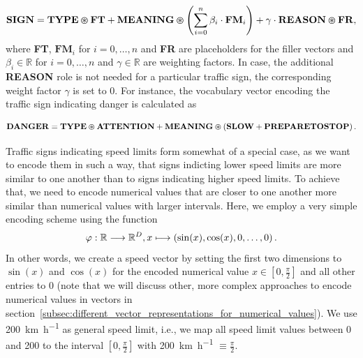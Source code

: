 \begin{equation}
    \label{eq:semantic_vocab_traffic_signs}
    \mathbf{SIGN} = \mathbf{TYPE} \varoast \mathbf{FT} + \mathbf{MEANING} \varoast \left( \sum\limits_{i=0}^{n} \beta_{i} \cdot  \mathbf{FM}_{i}  \right) + \gamma \cdot \mathbf{REASON} \varoast \mathbf{FR}, 
\end{equation}
where \textbf{FT}, $\mathbf{FM}_{i}$ for $i = 0, \ldots, n$ and \textbf{FR} are placeholders for the filler vectors and $\beta_{i} \in \mathbb{R} $ for $i = 0, \ldots, n$ and $\gamma \in \mathbb{R} $ are weighting factors.
In case, the additional \textbf{REASON} role is not needed for a particular traffic sign, the corresponding weight factor $\gamma$ is set to \num{0}.
For instance, the vocabulary vector encoding the traffic sign indicating danger is calculated as

\begin{equation}
\label{eq:semantic_vocab_traffic_sign_example}
\mathbf{DANGER} = \mathbf{TYPE} \varoast \mathbf{ATTENTION} + \mathbf{MEANING} \varoast  \left(\mathbf{SLOW} + \mathbf{PREPARETOSTOP}\right).
\end{equation}

Traffic signs indicating speed limits form somewhat of a special case, as we want to encode them in such a way, that signs indicting lower speed limits are more similar to one another than to signs indicating higher speed limits.
To achieve that, we need to encode numerical values that are closer to one another more similar than numerical values with larger intervals.
Here, we employ a very simple encoding scheme using the function 
\begin{equation}
\label{eq:cosin_vec_func}
\varphi: \mathbb{R} \longrightarrow \mathbb{R}^{D}, x \longmapsto \left(\sin(x), \cos(x), 0, \ldots, 0\right).
\end{equation}
In other words, we create a speed vector by setting the first two dimensions to $\sin(x)$ and $\cos(x)$ for the encoded numerical value $x \in [0,\frac{\pi}{2}]$ and all other entries to \num{0} (note that we will discuss other, more complex approaches to encode numerical values in vectors in section~\ref{subsec:different_vector_representations_for_numerical_values}).
We use \SI[per-mode=symbol]{200}{\kilo\meter\per\hour} as general speed limit, i.e., we map all speed limit values between \num{0} and \num{200} to the interval $\left[0, \frac{\pi}{2}\right]$ with \SI[per-mode=symbol]{200}{\kilo\meter\per\hour} $\equiv \frac{\pi}{2}$.


